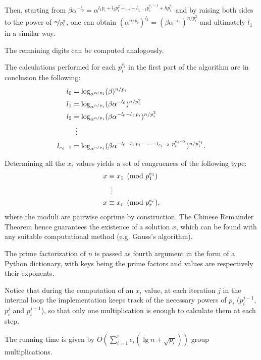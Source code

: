 \documentclass[UTF8]{article}
\begin{document}
Then, starting from $\beta\alpha^{-l_0} = \alpha^{l_1 p_i + l_2 p_i^2 + \ldots + l_{e_i - 1} p_i^{e_i - 1}+hp_i^{e_i}}$ and by raising both sides to the power of $\nicefrac{n}{p_i^2}$, one can obtain $(\alpha^{n/p_i})^{l_1}=(\beta\alpha^{-l_0})^{n/p_i^2}$ and ultimately $l_1$ in a similar way.

The remaining digits can be computed analogously.

The calculations performed for each $p_i^{e_i}$ in the first part of the algorithm are in conclusion the following:
\begin{align*}
    l_0         &              = \log_{\alpha^{n / p_i}}(\beta)^{n / p_i}                              \\
    l_1         &              = \log_{\alpha^{n / p_i}}(\beta\alpha^{-l_0})^{n / p_i^2}               \\
    l_2         &              = \log_{\alpha^{n / p_i}}(\beta\alpha^{-l_0 - l_1 \, p_i})^{n / p_i^3}  \\
                & \vdotswithin{=}                                                                      \\
    l_{e_i - 1} &              = \log_{\alpha^{n / p_i}}(\beta\alpha^{-l_0 - l_1 \, p_i - \, \ldots \, - l_{e_i - 2} \ p_i^{e_i - 2}})^{n / p_i^{e_i}}.
\end{align*}

Determining all the $x_i$ values yields a set of congruences of the following type:
\begin{align*}
    x & \equiv x_1 \pmod{p_1^{e_1}} \\
      & \vdotswithin{\equiv}        \\
    x & \equiv x_r \pmod{p_r^{e_r}},
\end{align*}
where the moduli are pairwise coprime by construction. The Chinese Remainder Theorem hence guarantees the existence of a solution $x$, which can be found with any suitable computational method (e.g. Gauss's algorithm).

\begin{minipage}{\linewidth}

\end{minipage}

The prime factorization of $n$ is passed as fourth argument in the form of a Python dictionary, with keys being the prime factors and values are respectively their exponents.

Notice that during the computation of an $x_i$ value, at each iteration $j$ in the internal loop the implementation keeps track of the necessary powers of $p_i$ ($p_i^{j-1}$, $p_i^j$ and $p_i^{j+1}$), so that only one multiplication is enough to calculate them at each step.

The running time is given by $O(\sum_{i=1}^{r}e_i(\lg n + \sqrt{p_i}))$ group multiplications.
\end{document}
